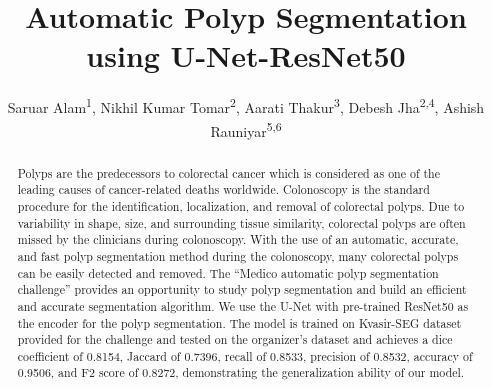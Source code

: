 \documentclass[sigconf]{acmart-me}
\begin{document}
\title{Automatic Polyp Segmentation using U-Net-ResNet50}



\author{Saruar Alam\textsuperscript{1}, Nikhil Kumar Tomar\textsuperscript{2}, Aarati Thakur\textsuperscript{3},   Debesh Jha\textsuperscript{2,4}, Ashish Rauniyar\textsuperscript{5,6}}







\renewcommand{\shorttitle}{MediaEval'20: Multimedia Evaluation Workshop}
\renewcommand{\shortauthors}{S. Alam et. al.}

\begin{abstract}
Polyps are the predecessors to colorectal cancer which is considered as one of the leading causes of cancer-related deaths worldwide. Colonoscopy is the standard procedure for the identification, localization, and removal of colorectal polyps. Due to variability in shape, size, and surrounding tissue similarity, colorectal polyps are often missed by the clinicians during colonoscopy. With the use of an automatic, accurate, and fast polyp segmentation method during the colonoscopy, many colorectal polyps can be easily detected and removed. The ``Medico automatic polyp segmentation challenge'' provides an opportunity to study polyp segmentation and build an efficient and accurate segmentation algorithm. We use the U-Net with pre-trained ResNet50 as the encoder for the polyp segmentation. The model is trained on Kvasir-SEG dataset provided for the challenge and tested on the organizer's dataset and achieves a dice coefficient of 0.8154, Jaccard of 0.7396, recall of 0.8533, precision of 0.8532, accuracy of 0.9506, and F2 score of 0.8272, demonstrating the generalization ability of our model.
\end{abstract}
\end{document}
